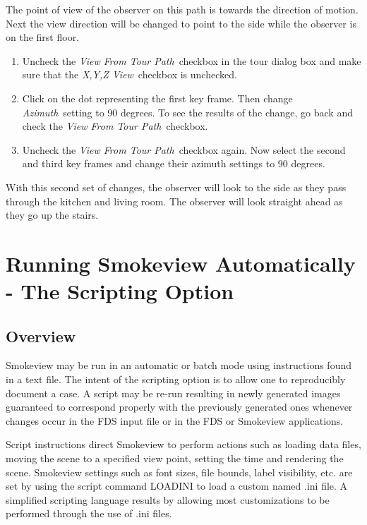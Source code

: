 \documentclass[11pt,twoside]{book}
\begin{document}
The point of view of the observer on this path is towards the
direction of motion. Next the view direction will be changed to
point to the side while the observer is on the first floor.

\begin{enumerate}
\item Uncheck the {\em View From Tour Path}\ checkbox in the
tour dialog box and make sure that the {\em X,Y,Z View}\
checkbox is unchecked.

\item Click on the dot representing the first key frame. Then
change {\em Azimuth}\ setting to 90 degrees.  To see the results
of the change, go back and check the {\em View From Tour Path}\
checkbox.

\item Uncheck the {\em View From Tour Path}\ checkbox again. Now
select the second and third key frames and change their azimuth
settings to 90 degrees.
\end{enumerate}

With this second set of changes, the observer will look to the
side as they pass through the kitchen and living room.  The
observer will look straight ahead as they go up the stairs.


\chapter{Running Smokeview Automatically - The Scripting Option}
\label{chapter:scripting}
\section{Overview}
Smokeview may be run in an automatic or batch mode using
instructions found in a text file.
The intent of the scripting option is to allow one to reproducibly document a case.
A script may be re-run resulting in newly generated images guaranteed
to correspond properly with the previously generated
ones whenever changes occur in the FDS input file or in the FDS or Smokeview applications.

Script instructions direct Smokeview to perform actions such as
loading data files, moving the scene to a specified view point,
setting the time and rendering the scene.
Smokeview settings such as font sizes, file bounds, label visibility,
etc. are set by using the script command LOADINI to load a custom named .ini file.
A simplified scripting language results by allowing
most customizations to be performed through the use of .ini files.
\end{document}
